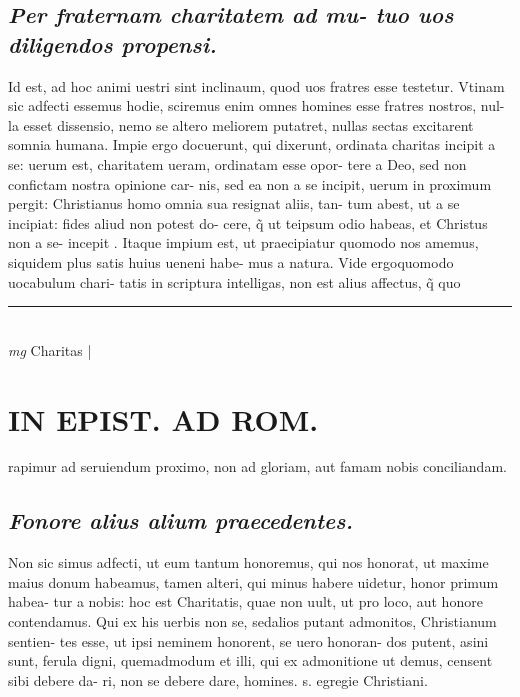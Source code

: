 \documentclass{article}
\begin{document}
\begin{pages}
\subsection*{\textit{Per fraternam charitatem ad mu- tuo uos diligendos propensi. }}\pstart Id est, ad hoc animi uestri sint inclinaum, quod uos fratres esse testetur. Vtinam sic adfecti essemus hodie, sciremus enim omnes homines esse fratres nostros, nul- la esset dissensio, nemo se altero meliorem putatret, nullas sectas excitarent somnia humana. Impie ergo docuerunt, qui dixerunt, ordinata charitas incipit a se: uerum est, charitatem ueram, ordinatam esse opor- tere a Deo, sed non confictam nostra opinione car- nis, sed ea non a se incipit, uerum in proximum pergit: Christianus homo omnia sua resignat aliis, tan- tum abest, ut a se incipiat: fides aliud non potest do- cere, q̃ ut teipsum odio habeas, et Christus non a se- incepit . Itaque impium est, ut praecipiatur quomodo nos amemus, siquidem plus satis huius ueneni habe- mus a natura. Vide ergoquomodo uocabulum chari- tatis in scriptura intelligas, non est alius affectus, q̃ quo  \pend
\vspace{0.5cm}\noindent
\vspace{0.2cm}\rule{1cm}{0.2pt}\\ 
\hspace{0.2cm}\textit{mg}
\footnotesize Charitas 
\normalsize| 
\section*{IN EPIST. AD ROM.  }
\marginpar{[ p.140 ]}\pstart rapimur ad seruiendum proximo, non ad gloriam, aut famam nobis conciliandam.  \pend
{}
{}
\subsection*{\textit{Fonore alius alium praecedentes. }}\pstart Non sic simus adfecti, ut eum tantum honoremus, qui nos honorat, ut maxime maius donum habeamus, tamen alteri, qui minus habere uidetur, honor primum habea- tur a nobis: hoc est Charitatis, quae non uult, ut pro loco, aut honore contendamus. Qui ex his uerbis non se, sedalios putant admonitos, Christianum sentien- tes esse, ut ipsi neminem honorent, se uero honoran- dos putent, asini sunt, ferula digni, quemadmodum et illi, qui ex admonitione ut demus, censent sibi debere da- ri, non se debere dare, homines. s. egregie Christiani.  \pend
{}
{}

\end{pages}
\end{document}
